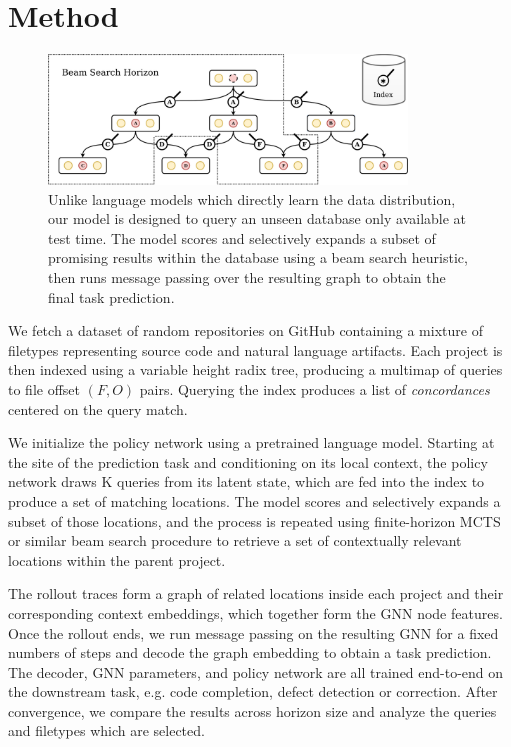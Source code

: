 \documentclass[11pt]{article}
\begin{document}
\section{Method}


\begin{figure}
  \centering
  \includegraphics[width=0.85\textwidth]{architecture}
  \caption{Unlike language models which directly learn the data distribution, our model is designed to query an unseen database only available at test time. The model scores and selectively expands a subset of promising results within the database using a beam search heuristic, then runs message passing over the resulting graph to obtain the final task prediction.}
\end{figure}

We fetch a dataset of random repositories on GitHub containing a mixture of filetypes representing source code and natural language artifacts. Each project is then indexed using a variable height radix tree, producing a multimap of queries to file offset $(F, O)$ pairs. Querying the index produces a list of \textit{concordances} centered on the query match.

 We initialize the policy network using a pretrained language model. Starting at the site of the prediction task and conditioning on its local context, the policy network draws K queries from its latent state, which are fed into the index to produce a set of matching locations. The model scores and selectively expands a subset of those locations, and the process is repeated using finite-horizon MCTS or similar beam search procedure to retrieve a set of contextually relevant locations within the parent project.

The rollout traces form a graph of related locations inside each project and their corresponding context embeddings, which together form the GNN node features. Once the rollout ends, we run message passing on the resulting GNN for a fixed numbers of steps and decode the graph embedding to obtain a task prediction. The decoder, GNN parameters, and policy network are all trained end-to-end on the downstream task, e.g. code completion, defect detection or correction. After convergence, we compare the results across horizon size and analyze the queries and filetypes which are selected.
\end{document}
